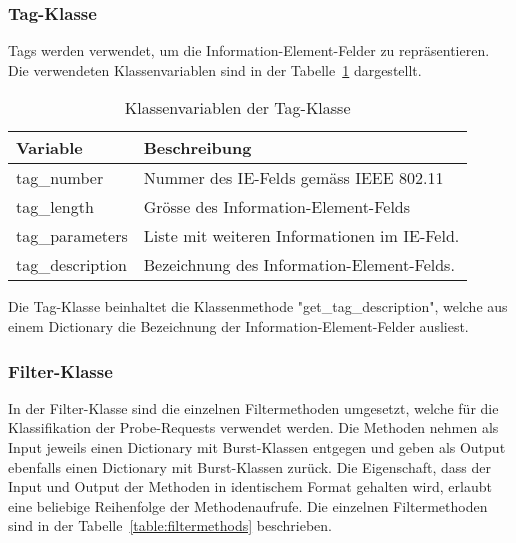 \subsubsection*{Tag-Klasse}
Tags werden verwendet, um die Information-Element-Felder zu repräsentieren.
Die verwendeten Klassenvariablen sind in der Tabelle~\ref{table:tagfields} 
dargestellt.

\begin{table}[h!]
    \centering
    \begin{tabular}{|l|l|}
        \hline
        \textbf{Variable} & \textbf{Beschreibung} \\
        \hline 
        tag\_number & Nummer des IE-Felds gemäss IEEE 802.11 \\
        \hline
        tag\_length & Grösse des Information-Element-Felds \\
        \hline
        tag\_parameters & Liste mit weiteren Informationen im IE-Feld. \\
        \hline
        tag\_description & Bezeichnung des Information-Element-Felds. \\
        \hline
    \end{tabular}
    \caption{Klassenvariablen der Tag-Klasse
    \label{table:tagfields}}  
\end{table}

Die Tag-Klasse beinhaltet die Klassenmethode "get\_tag\_description", 
welche aus einem Dictionary die Bezeichnung der Information-Element-Felder 
ausliest.

\clearpage

\subsubsection*{Filter-Klasse}
In der Filter-Klasse sind die einzelnen Filtermethoden umgesetzt, 
welche für die Klassifikation der Probe-Requests verwendet werden. 
Die Methoden nehmen als Input jeweils einen Dictionary mit Burst-Klassen 
entgegen und geben als Output ebenfalls einen Dictionary mit Burst-Klassen zurück.
Die Eigenschaft, dass der Input und Output der Methoden in identischem Format 
gehalten wird, erlaubt eine beliebige Reihenfolge der Methodenaufrufe.
Die einzelnen Filtermethoden sind in der Tabelle~\ref{table:filtermethods}
beschrieben.

